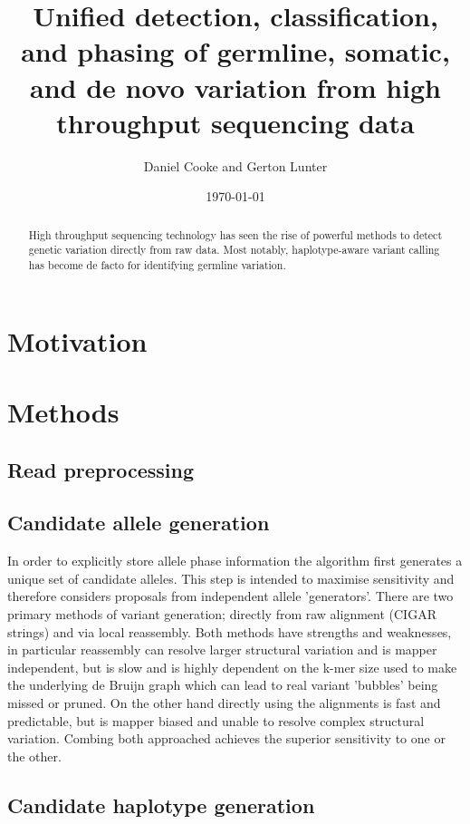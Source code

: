 \documentclass[notitlepage]{report}
\title{Unified detection, classification, and phasing of germline, somatic, and de novo variation from high throughput sequencing data}
\author{Daniel Cooke and Gerton Lunter}
\date{\today}
\begin{document}
\maketitle
\thispagestyle{empty}

\begin{abstract}
High throughput sequencing technology has seen the rise of powerful methods to detect genetic variation directly from raw data. Most notably, haplotype-aware variant calling has become de facto for identifying germline variation. 
\end{abstract}

\section*{Motivation}

\section*{Methods}

\subsection{Read preprocessing}



\subsection{Candidate allele generation}

In order to explicitly store allele phase information the algorithm first generates a unique set of candidate alleles. This step is intended to maximise sensitivity and therefore considers proposals from independent allele 'generators'. There are two primary methods of variant generation; directly from raw alignment (CIGAR strings) and via local reassembly. Both methods have strengths and weaknesses, in particular reassembly can resolve larger structural variation and is mapper independent, but is slow and is highly dependent on the k-mer size used to make the underlying de Bruijn graph which can lead to real variant 'bubbles' being missed or pruned. On the other hand directly using the alignments is fast and predictable, but is mapper biased and unable to resolve complex structural variation. Combing both approached achieves the superior sensitivity to one or the other.

\subsection{Candidate haplotype generation}
\end{document}
